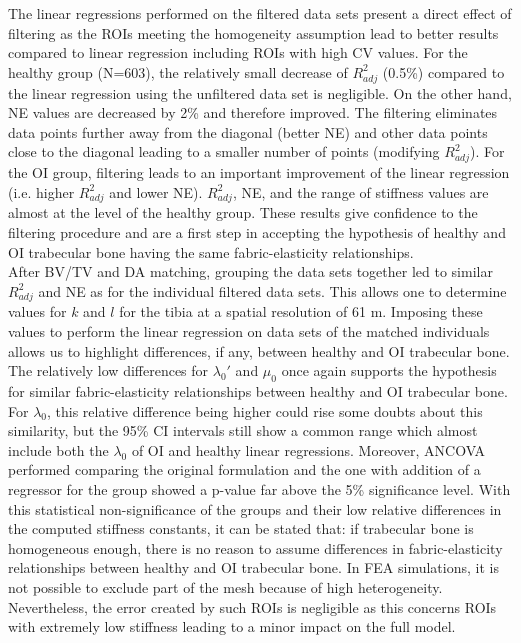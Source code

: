 \documentclass[a4paper,fleqn]{DC_ArtStyle}
\begin{document}
The linear regressions performed on the filtered data sets present a direct effect of filtering as the ROIs meeting the homogeneity assumption lead to better results compared to linear regression including ROIs with high CV values. For the healthy group (N=603), the relatively small decrease of $R^2_{adj}$ (0.5\%) compared to the linear regression using the unfiltered data set is negligible. On the other hand, NE values are decreased by 2\% and therefore improved. The filtering eliminates data points further away from the diagonal (better NE) and other data points close to the diagonal leading to a smaller number of points (modifying $R^2_{adj}$). For the OI group, filtering leads to an important improvement of the linear regression (i.e. higher $R^2_{adj}$ and lower NE). $R^2_{adj}$, NE, and the range of stiffness values are almost at the level of the healthy group. These results give confidence to the filtering procedure and are a first step in accepting the hypothesis of healthy and OI trabecular bone having the same fabric-elasticity relationships.\\

After BV/TV and DA matching, grouping the data sets together led to similar $R^2_{adj}$ and NE as for the individual filtered data sets. This allows one to determine values for $k$ and $l$ for the tibia at a spatial resolution of 61 \si{\micro}m. Imposing these values to perform the linear regression on data sets of the matched individuals allows us to highlight differences, if any, between healthy and OI trabecular bone. The relatively low differences for $\lambda_0'$ and $\mu_0$ once again supports the hypothesis for similar fabric-elasticity relationships between healthy and OI trabecular bone. For $\lambda_0$, this relative difference being higher could rise some doubts about this similarity, but the 95\% CI intervals still show a common range which almost include both the $\lambda_0$ of OI and healthy linear regressions. Moreover, ANCOVA performed comparing the original formulation and the one with addition of a regressor for the group showed a p-value far above the 5\% significance level. With this statistical non-significance of the groups and their low relative differences in the computed stiffness constants, it can be stated that: if trabecular bone is homogeneous enough, there is no reason to assume differences in fabric-elasticity relationships between healthy and OI trabecular bone. In FEA simulations, it is not possible to exclude part of the mesh because of high heterogeneity. Nevertheless, the error created by such ROIs is negligible as this concerns ROIs with extremely low stiffness leading to a minor impact on the full model.\\
\end{document}
